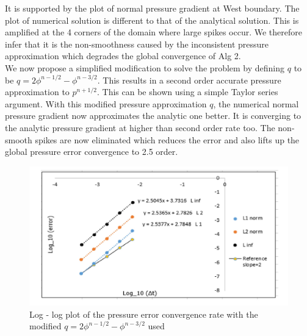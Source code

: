 It is supported by the plot of normal pressure gradient at West boundary. The plot of numerical solution is different to that of the analytical solution. This is amplified at the 4 corners of the domain where large spikes occur. We therefore infer that it is the non-smoothness caused by the inconsistent pressure approximation which degrades the global convergence of Alg 2.\\

We now propose a simplified modification to solve the problem by defining $q$ to be $q = 2\phi^{n-1/2} - \phi^{n-3/2}$. This results in a second order accurate pressure approximation to $p^{n+1/2}$. This can be shown using a simple Taylor series argument. With this modified pressure approximation $q$, the numerical normal pressure gradient now approximates the analytic one better. It is converging to the analytic pressure gradient at higher than second order rate too. The non-smooth spikes are now eliminated which reduces the error and also lifts up the global pressure error convergence to 2.5 order.

\begin{figure}[H]
	\centering
	\includegraphics[width=4.5in]{figures/Pm1b2_unf1_np_P_rate.jpg}
	\caption{Log - log plot of the pressure error convergence rate with the modified $q = 2\phi^{n-1/2} - \phi^{n-3/2}$ used }\label{fig:6.23}
\end{figure}

